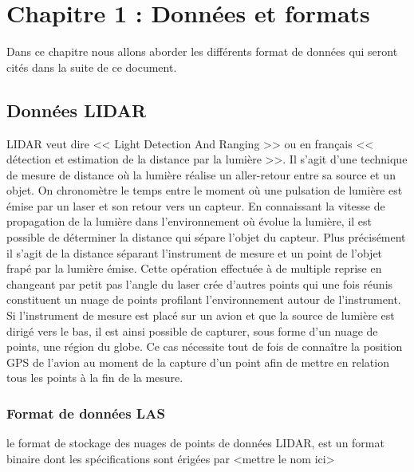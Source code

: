 \chapter{Chapitre 1 : Données et formats}


Dans ce chapitre nous allons aborder les différents format de données qui seront
cités dans la suite de ce document.

\section{Données LIDAR}

LIDAR veut dire << Light Detection And Ranging >> ou en français 
<< détection et estimation de la distance par la lumière >>. 
Il s’agit d’une technique de mesure de distance où la lumière réalise un 
aller-retour entre sa source et un objet. On chronomètre le temps entre le moment 
où une pulsation de lumière est émise par un laser et son retour vers un capteur.
En connaissant la vitesse de propagation de la lumière dans l’environnement où
évolue la lumière, il est possible de déterminer la distance qui sépare l’objet 
du capteur. Plus précisément il s’agit de la distance  séparant l'instrument de
mesure et un point de l’objet frapé par la lumière émise. 
Cette opération effectuée à de multiple reprise en changeant par petit pas 
l’angle du laser crée d’autres points qui une fois réunis 
constituent un nuage de points profilant l'environnement autour de l'instrument.
Si l'instrument de mesure est placé sur un avion et que la source de lumière est
dirigé vers le bas, il est ainsi possible de capturer, sous forme d'un nuage de
points, une région du globe. Ce cas nécessite tout de fois de connaître la position
GPS de l'avion au moment de la capture d'un point afin de mettre en relation
tous les points à la fin de la mesure.

\subsection{Format de données LAS}

le format de stockage des nuages de points de données LIDAR, est un format
binaire dont les spécifications sont érigées par <mettre le nom ici>

